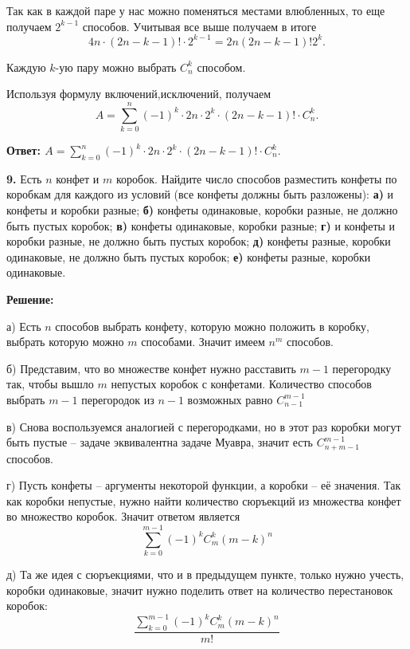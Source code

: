 \documentclass[a4paper,12pt]{article} %
\begin{document}
Так как в каждой паре у нас можно поменяться местами влюбленных, то еще получаем $2^{k-1}$ способов. Учитывая все выше получаем в итоге 
\[ 4n\cdot (2n - k - 1)!\cdot 2^{k-1} = 2n(2n - k - 1)! 2^k.\]

Каждую $k$-ую пару можно выбрать $C_n^k$ способом.

Используя формулу включений,исключений, получаем 
\[ A = \sum\limits_{k = 0}^{n}(-1)^k\cdot 2n\cdot 2^k\cdot (2n - k -1)!\cdot C_n^k.\] 
 
\begin{flushright}
\begin{large}
\textbf {Ответ: $ A = \sum\limits_{k = 0}^{n}(-1)^k\cdot 2n\cdot 2^k\cdot (2n - k -1)!\cdot C_n^k.$ }
\end{large}
\end{flushright}


{\bf 9.} Есть $n$ конфет и $m$ коробок. Найдите число способов разместить конфеты по коробкам для каждого из условий (все конфеты должны быть разложены): {\bf а)} и конфеты и коробки разные; {\bf б)} конфеты одинаковые, коробки разные, не должно быть пустых коробок; {\bf в)} конфеты одинаковые, коробки разные; {\bf г)} и конфеты и коробки разные, не должно быть пустых коробок; {\bf д)} конфеты разные, коробки одинаковые, не должно быть пустых коробок; {\bf е)} конфеты разные, коробки одинаковые.
\begin{center}
\bfseries
{\Large Решение: }
\end{center}

а) Есть $n$ способов выбрать конфету, которую можно положить в коробку, выбрать которую можно $m$ способами. Значит имеем $n^m$ способов.

б) Представим, что во множестве конфет нужно расставить $m-1$ перегородку так, чтобы вышло $m$ непустых коробок с конфетами. Количество способов выбрать $m-1$ перегородок из $n-1$ возможных равно $C^{m-1}_{n-1}$

в) Снова воспользуемся аналогией с перегородками, но в этот раз коробки могут быть пустые -- задаче эквивалентна задаче Муавра, значит есть $C^{m-1}_{n + m-1}$ способов.

г) Пусть конфеты -- аргументы некоторой функции, а коробки -- её значения. Так как коробки непустые, нужно найти количество сюръекций из множества конфет во множество коробок. Значит ответом является
\[\sum_{k=0}^{m-1} (-1)^k C^k_m (m-k)^n\]

д) Та же идея с сюръекциями, что и в предыдущем пункте, только нужно учесть, коробки одинаковые, значит нужно поделить ответ на количество перестановок коробок:
\[\frac{\sum_{k=0}^{m-1} (-1)^k C^k_m (m-k)^n}{m!}\]
\end{document}
